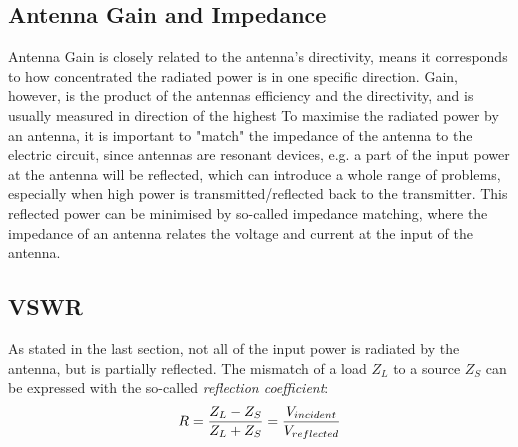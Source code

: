 \subsection{Antenna Gain and Impedance}
Antenna Gain is closely related to the antenna's directivity, means it corresponds to how concentrated the radiated power is in one specific direction. 
Gain, however, is the product of the antennas efficiency and the directivity, and is usually measured in direction of the highest
To maximise the radiated power by an antenna, it is important to "match" the impedance of the antenna to the electric circuit, since antennas are resonant devices, e.g. a part of the input power at the antenna will be reflected, which can introduce a whole range of problems, especially when high power is transmitted/reflected back to the transmitter. This reflected power can be minimised by so-called impedance matching, where the impedance of an antenna relates the voltage and current at the input of the antenna.\\

\subsection{VSWR}
\label{sec:vswr}
As stated in the last section, not all of the input power is radiated by the antenna, but is partially reflected. The mismatch of a load $Z_L$ to a source $Z_S$ can be expressed with the so-called \textit{reflection coefficient}:
\begin{equation}
	\centering
	R = \frac{Z_L - Z_S}{Z_L + Z_S} = \frac{V_{incident}}{V_{reflected}}
\end{equation}

